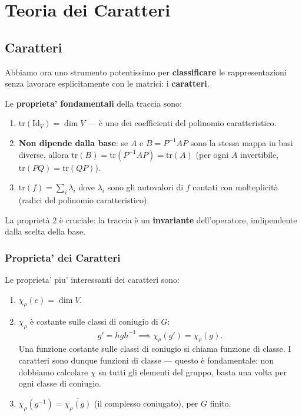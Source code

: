 % 
\chapter{Teoria dei Caratteri}
\section{Caratteri}
Abbiamo ora uno strumento potentissimo per \textbf{classificare} le rappresentazioni senza lavorare esplicitamente con le matrici: i \textbf{caratteri}.


Le \textbf{proprieta' fondamentali} della traccia sono:
\begin{enumerate}
\item $\mathrm{tr}(\mathrm{Id}_V) = \dim V$ — è uno dei coefficienti del polinomio caratteristico.
\item \textbf{Non dipende dalla base}: se $A$ e $B = P^{-1}AP$ sono la stessa mappa in basi diverse, allora $\mathrm{tr}(B) = \mathrm{tr}(P^{-1}AP) = \mathrm{tr}(A)$ (per ogni $A$ invertibile, $\mathrm{tr}(PQ) = \mathrm{tr}(QP)$).
\item $\mathrm{tr}(f) = \sum_i \lambda_i$ dove $\lambda_i$ sono gli autovalori di $f$ contati con molteplicità (radici del polinomio caratteristico).
\end{enumerate}
La proprietà 2 è cruciale: la traccia è un \textbf{invariante} dell'operatore, indipendente dalla scelta della base.

\subsection{Proprieta' dei Caratteri}
Le proprieta' piu' interessanti dei caratteri sono:
\begin{enumerate}
\item $\chi_\rho(e) = \dim V$.
\item $\chi_\rho$ è costante sulle classi di coniugio di $G$:
  $$g' = hgh^{-1} \implies \chi_\rho(g') = \chi_\rho(g).$$
    Una funzione costante sulle classi di coniugio si chiama funzione di classe. I caratteri sono dunque funzioni di classe — questo è fondamentale: non dobbiamo calcolare $\chi$ su tutti gli elementi del gruppo, basta una volta per ogni classe di coniugio.
\item $\chi_\rho(g^{-1}) = \overline{\chi_\rho(g)}$ (il complesso coniugato), per $G$ finito.
\end{enumerate}

